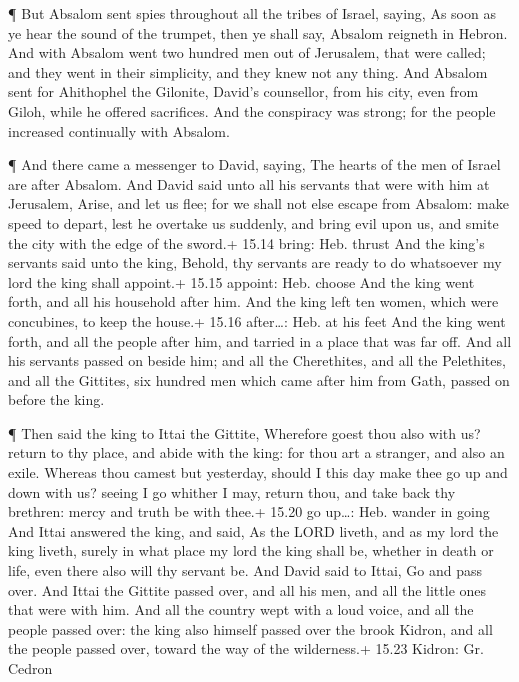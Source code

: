  ¶ But Absalom sent spies throughout all the tribes of
Israel, saying, As soon as ye hear the sound of the trumpet, then ye
shall say, Absalom reigneth in Hebron.  And with Absalom
went two hundred men out of Jerusalem, that were called; and they went
in their simplicity, and they knew not any thing.  And
Absalom sent for Ahithophel the Gilonite, David's counsellor, from his
city, even from Giloh, while he offered sacrifices. And the conspiracy
was strong; for the people increased continually with Absalom.

 ¶ And there came a messenger to David, saying, The hearts
of the men of Israel are after Absalom.  And David said
unto all his servants that were with him at Jerusalem, Arise, and let us
flee; for we shall not else escape from Absalom: make speed to depart,
lest he overtake us suddenly, and bring evil upon us, and smite the city
with the edge of the sword.+ 15.14 bring: Heb. thrust  And
the king's servants said unto the king, Behold, thy servants are ready
to do whatsoever my lord the king shall appoint.+ 15.15 appoint: Heb.
choose  And the king went forth, and all his household
after him. And the king left ten women, which were concubines, to keep
the house.+ 15.16 after\ldots: Heb. at his feet  And the
king went forth, and all the people after him, and tarried in a place
that was far off.  And all his servants passed on beside
him; and all the Cherethites, and all the Pelethites, and all the
Gittites, six hundred men which came after him from Gath, passed on
before the king.

 ¶ Then said the king to Ittai the Gittite, Wherefore goest
thou also with us? return to thy place, and abide with the king: for
thou art a stranger, and also an exile.  Whereas thou
camest but yesterday, should I this day make thee go up and down with
us? seeing I go whither I may, return thou, and take back thy brethren:
mercy and truth be with thee.+ 15.20 go up\ldots: Heb. wander in going
 And Ittai answered the king, and said, As the LORD liveth,
and as my lord the king liveth, surely in what place my lord the king
shall be, whether in death or life, even there also will thy servant be.
 And David said to Ittai, Go and pass over. And Ittai the
Gittite passed over, and all his men, and all the little ones that were
with him.  And all the country wept with a loud voice, and
all the people passed over: the king also himself passed over the brook
Kidron, and all the people passed over, toward the way of the
wilderness.+ 15.23 Kidron: Gr. Cedron

